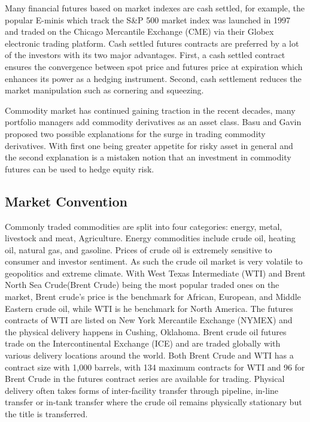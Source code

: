 Many financial futures based on market indexes are cash settled, for example, the popular E-minis which track the S\&P 500 market index was launched in 1997 and traded on the Chicago Mercantile Exchange (CME) via their Globex electronic trading platform. Cash settled futures contracts are preferred by a lot of the investors with its two major advantages\parencite{lien_tse_2002}. First, a cash settled contract ensures the convergence between spot price and futures price at expiration which enhances its power as a hedging instrument. Second, cash settlement reduces the market manipulation such as cornering and squeezing.  

Commodity market has continued gaining traction in the recent decades, many portfolio managers add commodity derivatives as an asset class. Basu and Gavin\parencite{basu_gavin_2011} proposed two possible explanations for the surge in trading commodity derivatives. With first one being greater appetite for risky asset in general and the second explanation is a mistaken notion that an investment in commodity futures can be used to hedge equity risk.











\subsection{Market Convention}
Commonly traded commodities are split into four categories: energy, metal, livestock and meat, Agriculture. Energy commodities include crude oil, heating oil, natural gas, and gasoline. Prices of crude oil is extremely sensitive to consumer and investor sentiment. As such the crude oil market is very volatile to geopolitics and extreme climate. With West Texas Intermediate (WTI) and Brent North Sea Crude(Brent Crude) being the most popular traded ones on the market, Brent crude's price is the benchmark for African, European, and Middle Eastern crude oil, while WTI is he benchmark for North America. The futures contracts of WTI are listed on New York Mercantile Exchange (NYMEX) and the physical delivery happens in Cushing, Oklahoma\parencite{cme_future}.  Brent crude oil futures trade on the Intercontinental Exchange (ICE) and are traded globally with various delivery locations around the world. Both Brent Crude and WTI has a contract size with 1,000 barrels, with 134 maximum contracts for WTI and 96 for Brent Crude in the futures contract series are available for trading. 
Physical delivery often takes forms of inter-facility transfer through pipeline, in-line transfer or in-tank transfer where the crude oil remains physically stationary but the title is transferred. 


